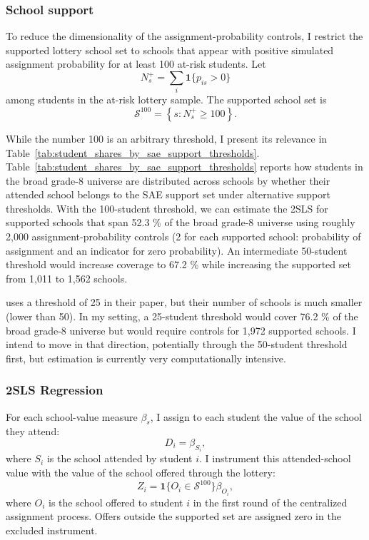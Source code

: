 \documentclass[a4paper, article, english, oneside, unknownkeysallowed, 12pt]{memoir}
\begin{document}
\subsubsection{School support}

To reduce the dimensionality of the assignment-probability controls, I restrict the supported lottery school set to schools that appear with positive simulated assignment probability for at least 100 at-risk students. Let
\[
N_s^{+}
=
\sum_i
\mathbf{1}\{p_{is} > 0\}
\]
among students in the at-risk lottery sample. The supported school set is
\[
\mathcal{S}^{100}
=
\left\{
s : N_s^{+} \geq 100
\right\}.
\]


While the number 100 is an arbitrary threshold, I present its relevance in Table~\ref{tab:student_shares_by_sae_support_thresholds}. 
Table~\ref{tab:student_shares_by_sae_support_thresholds} reports how students in the broad grade-8 universe are distributed across schools by whether their attended school belongs to the SAE support set under alternative support thresholds.
With the 100-student threshold, we can estimate the 2SLS for supported schools that span 52.3 \% of the broad grade-8 universe using roughly 2,000 assignment-probability controls (2 for each supported school: probability of assignment and an indicator for zero probability).
An intermediate 50-student threshold would increase coverage to 67.2 \% while increasing the supported set from 1,011 to 1,562 schools.

\textcite{angrist_leveraging_2017} uses a threshold of 25 in their paper, but their number of schools is much smaller (lower than 50). In my setting, a 25-student threshold would cover 76.2 \% of the broad grade-8 universe but would require controls for 1,972 supported schools. I intend to move in that direction, potentially through the 50-student threshold first, but estimation is currently very computationally intensive. 




\subsubsection{2SLS Regression}




For each school-value measure \(\beta_s\), I assign to each student the value of the school they attend:
\[
D_i = \beta_{S_i}, 
\]
where \(S_i\) is the school attended by student \(i\). I instrument this attended-school value with the value of the school offered through the lottery:
\[
Z_i
=
\mathbf{1}\{O_i \in \mathcal{S}^{100}\}\beta_{O_i},
\]
where \(O_i\) is the school offered to student \(i\) in the first round of the centralized assignment process. Offers outside the supported set are assigned zero in the excluded instrument.
\end{document}
